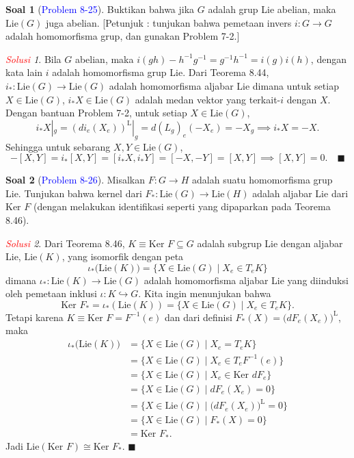 \documentclass[11pt]{article}
\theoremstyle{definition}
\newtheorem*{problem}{Soal}
\theoremstyle{remark}
\newtheorem*{solution}{\textcolor{red}{Solusi}}
\newcommand{\Lie}{\text{Lie}}               %
\newcommand{\LieG}{\text{Lie}(G)}           %
\newcommand{\LieH}{\text{Lie}(H)}               %
\newcommand{\kernel}{\text{Ker }}           %
\begin{document}
\begin{problem}[\textcolor{blue}{Problem 8-25}]
Buktikan bahwa jika $G$ adalah grup Lie abelian, maka $\LieG$ juga abelian. [Petunjuk : tunjukan bahwa pemetaan invers $i : G \to G$ adalah homomorfisma grup, dan gunakan Problem 7-2.] 
\end{problem}
\begin{solution}
Bila $G$ abelian, maka $i(gh) - h^{-1}g^{-1} = g^{-1}h^{-1} = i(g)i(h)$, dengan kata lain $i$ adalah homomorfisma grup Lie. Dari Teorema 8.44, $i_* : \LieG \to \LieG$ adalah homomorfisma aljabar Lie dimana untuk setiap $X \in \LieG$, $i_*X \in \LieG$ adalah medan vektor yang terkait-$i$ dengan $X$. Dengan bantuan Problem 7-2, untuk setiap $X \in \LieG$, 
$$
i_*X|_g = (di_e(X_e))^{\text{L}}|_g = d(L_g)_e (-X_e) = -X_g \implies i_*X = -X. 
$$
Sehingga untuk sebarang $X,Y \in \LieG$,
$$
-[X,Y] = i_*[X,Y] = [i_*X,i_*Y] = [-X,-Y] = [X,Y] \implies [X,Y] = 0. \quad \blacksquare
$$
\end{solution}

\begin{problem}[\textcolor{blue}{Problem 8-26}]
Misalkan $F : G \to H$ adalah suatu homomorfisma grup Lie. Tunjukan bahwa kernel dari $F_{*} : \LieG \to \LieH$ adalah aljabar Lie dari $\kernel F$ (dengan melakukan identifikasi seperti yang dipaparkan pada Teorema 8.46).
\end{problem}
\begin{solution}
Dari Teorema 8.46, $K\equiv \kernel F \subseteq G$ adalah subgrup Lie dengan aljabar Lie, $\Lie (K)$, yang isomorfik dengan peta 
$$
\iota_*\big(\Lie(K)\big) = \{ X \in \LieG \mid X_e \in T_eK\}
$$
dimana $\iota_* : \Lie(K) \to \LieG$ 
adalah homomorfisma aljabar Lie yang diinduksi oleh pemetaan inklusi $\iota : K \hookrightarrow G$. Kita ingin menunjukan bahwa 
$$
\kernel F_* = \iota_* (\Lie(K)) = \{X \in \LieG \mid X_e \in T_eK\}.
$$
Tetapi karena $K \equiv \kernel F = F^{-1}(e)$ dan dari definisi $F_*(X) = \big(dF_e(X_e)\big)^{\text{L}}$, maka
\begin{align*}
\iota_*\big(\Lie(K)\big) &= \{ X \in \LieG \mid X_e = T_eK\} \\
&= \{ X \in \LieG \mid X_e \in T_eF^{-1}(e) \} \\
&= \{  X \in \LieG \mid X_e \in \kernel dF_e \} \\
&= \{ X\in \LieG \mid dF_e(X_e) = 0 \} \\
&= \{ X\in \LieG \mid \big(dF_e(X_e)\big)^{\text{L}} = 0 \} \\
&= \{ X\in \LieG \mid F_*(X) =0 \} \\
&= \kernel F_*.
\end{align*}
Jadi $\Lie(\kernel F) \cong \kernel F_*$. $\blacksquare$
\end{solution}
\end{document}
